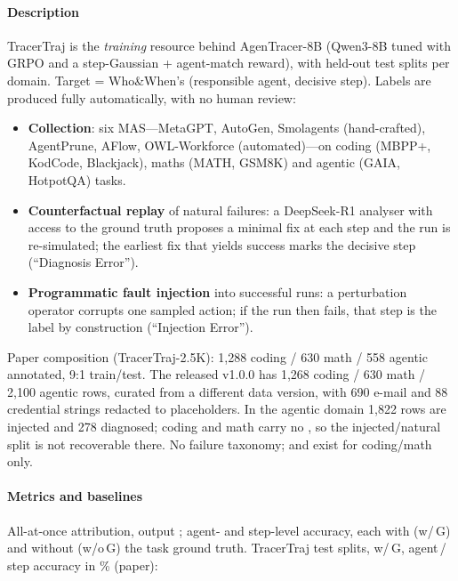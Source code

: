 \paragraph{Description} TracerTraj is the \emph{training} resource behind AgenTracer-8B (Qwen3-8B tuned with GRPO and a step-Gaussian + agent-match reward), with held-out test splits per domain. Target = Who\&When's (responsible agent, decisive step). Labels are produced fully automatically, with no human review:
\begin{itemize}
\item \textbf{Collection}: six MAS---MetaGPT, AutoGen, Smolagents (hand-crafted), AgentPrune, AFlow, OWL-Workforce (automated)---on coding (MBPP+, KodCode, Blackjack), maths (MATH, GSM8K) and agentic (GAIA, HotpotQA) tasks.
\item \textbf{Counterfactual replay} of natural failures: a DeepSeek-R1 analyser with access to the ground truth proposes a minimal fix at each step and the run is re-simulated; the earliest fix that yields success marks the decisive step (``Diagnosis Error'').
\item \textbf{Programmatic fault injection} into successful runs: a perturbation operator corrupts one sampled action; if the run then fails, that step is the label by construction (``Injection Error'').
\end{itemize}
Paper composition (TracerTraj-2.5K): 1,288 coding / 630 math / 558 agentic annotated, 9:1 train/test. The released v1.0.0 has 1,268 coding / 630 math / 2,100 agentic rows, curated from a different data version, with 690 e-mail and 88 credential strings redacted to placeholders. In the agentic domain 1,822 rows are injected and 278 diagnosed; coding and math carry no , so the injected/natural split is not recoverable there. No failure taxonomy;  and  exist for coding/math only.

\paragraph{Metrics and baselines} All-at-once attribution, output ; agent- and step-level accuracy, each with (w/\,G) and without (w/o\,G) the task ground truth. TracerTraj test splits, w/\,G, agent\,/\,step accuracy in \% (paper):

